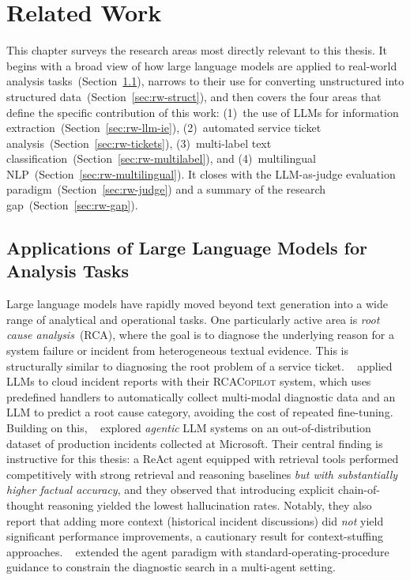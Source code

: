 \chapter{Related Work}
%
\label{chap:RelatedWork}
%
This chapter surveys the research areas most directly relevant to this thesis.
It begins with a broad view of how large language models are applied to
real-world analysis tasks~(Section~\ref{sec:rw-llm-apps}), narrows to their
use for converting unstructured into structured data~(Section~\ref{sec:rw-struct}),
and then covers the four areas that define the specific contribution of this
work: (1)~the use of LLMs for information extraction~(Section~\ref{sec:rw-llm-ie}),
(2)~automated service ticket analysis~(Section~\ref{sec:rw-tickets}),
(3)~multi-label text classification~(Section~\ref{sec:rw-multilabel}), and
(4)~multilingual NLP~(Section~\ref{sec:rw-multilingual}).  It closes with the
LLM-as-judge evaluation paradigm~(Section~\ref{sec:rw-judge}) and a summary of
the research gap~(Section~\ref{sec:rw-gap}).

\section{Applications of Large Language Models for Analysis Tasks}
\label{sec:rw-llm-apps}
%
Large language models have rapidly moved beyond text generation into a wide
range of analytical and operational tasks.  One particularly active area is
\emph{root cause analysis}~(RCA), where the goal is to diagnose the underlying
reason for a system failure or incident from heterogeneous textual evidence.
This is structurally similar to diagnosing the root problem of a service
ticket.  \citeauthor{chen2024automatic}~\cite{chen2024automatic} applied LLMs
to cloud incident reports with their \textsc{RCACopilot} system, which uses
predefined handlers to automatically collect multi-modal diagnostic data and
an LLM to predict a root cause category, avoiding the cost of repeated
fine-tuning.  Building on this, \citeauthor{roy2024exploring}~%
\cite{roy2024exploring} explored \emph{agentic} LLM systems on an
out-of-distribution dataset of production incidents collected at Microsoft.
Their central finding is instructive for this thesis: a ReAct agent equipped
with retrieval tools performed competitively with strong retrieval and
reasoning baselines \emph{but with substantially higher factual accuracy}, and
they observed that introducing explicit chain-of-thought reasoning yielded the
lowest hallucination rates.  Notably, they also report that adding more context
(historical incident discussions) did \emph{not} yield significant performance
improvements, a cautionary result for context-stuffing approaches.
\citeauthor{pei2025flowofaction}~\cite{pei2025flowofaction} extended the agent
paradigm with standard-operating-procedure guidance to constrain the diagnostic
search in a multi-agent setting.

